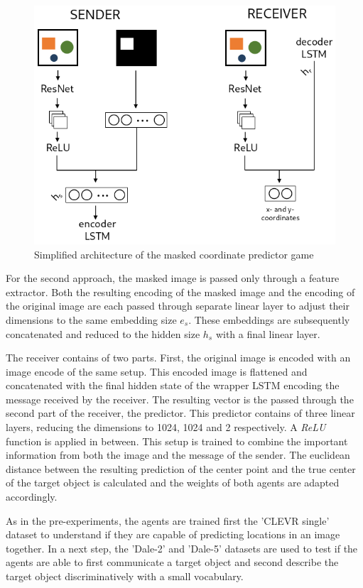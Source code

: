 \begin{figure}[h]
    \centering
    \includegraphics[width=.7\linewidth]{figures/arch_coordinate_predictor_game.png}
    \caption{Simplified architecture of the masked coordinate predictor game}
    \label{fig:coordinate_predictor_game_architecture}
\end{figure}

For the second approach, the masked image is passed only through a feature extractor.
Both the resulting encoding of the masked image and the encoding of the original image are each passed through separate linear layer to adjust their dimensions to the same embedding size $e_s$.
These embeddings are subsequently concatenated and reduced to the hidden size $h_s$ with a final linear layer.

The receiver contains of two parts.
First, the original image is encoded with an image encode of the same setup.
This encoded image is flattened and concatenated with the final hidden state of the wrapper LSTM encoding the message received by the receiver.
The resulting vector is the passed through the second part of the receiver, the predictor.
This predictor contains of three linear layers, reducing the dimensions to 1024, 1024 and 2 respectively.
A \emph{ReLU} function is applied in between.
This setup is trained to combine the important information from both the image and the message of the sender.
The euclidean distance between the resulting prediction of the center point and the true center of the target object is calculated and the weights of both agents are adapted accordingly.

As in the pre-experiments, the agents are trained first the 'CLEVR single' dataset to understand if they are capable of predicting locations in an image together.
In a next step, the 'Dale-2' and 'Dale-5' datasets are used to test if the agents are able to first communicate a target object and second describe the target object discriminatively with a small vocabulary.

